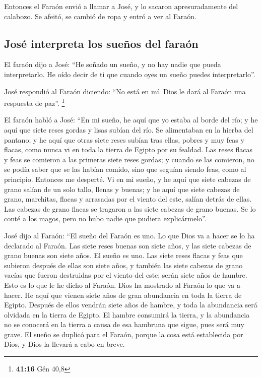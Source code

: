 \begin{paracol}{2}
 Entonces el Faraón envió a llamar a José, y lo sacaron
apresuradamente del calabozo. Se afeitó, se cambió de ropa y entró a ver
al Faraón.

\hypertarget{josuxe9-interpreta-los-sueuxf1os-del-farauxf3n}{%
\subsection{José interpreta los sueños del
faraón}\label{josuxe9-interpreta-los-sueuxf1os-del-farauxf3n}}

 El faraón dijo a José: ``He soñado un sueño, y no hay
nadie que pueda interpretarlo. He oído decir de ti que cuando oyes un
sueño puedes interpretarlo''.

 José respondió al Faraón diciendo: ``No está en mí. Dios
le dará al Faraón una respuesta de paz''. \footnote{\textbf{41:16} Gén
  40,8}

 El faraón habló a José: ``En mi sueño, he aquí que yo
estaba al borde del río;  y he aquí que siete reses
gordas y lisas subían del río. Se alimentaban en la hierba del pantano;
 y he aquí que otras siete reses subían tras ellas,
pobres y muy feas y flacas, como nunca vi en toda la tierra de Egipto
por su fealdad.  Las reses flacas y feas se comieron a
las primeras siete reses gordas;  y cuando se las
comieron, no se podía saber que se las habían comido, sino que seguían
siendo feas, como al principio. Entonces me desperté.  Vi
en mi sueño, y he aquí que siete cabezas de grano salían de un solo
tallo, llenas y buenas;  y he aquí que siete cabezas de
grano, marchitas, flacas y arrasadas por el viento del este, salían
detrás de ellas.  Las cabezas de grano flacas se tragaron
a las siete cabezas de grano buenas. Se lo conté a los magos, pero no
hubo nadie que pudiera explicármelo''.

 José dijo al Faraón: ``El sueño del Faraón es uno. Lo
que Dios va a hacer se lo ha declarado al Faraón.  Las
siete reses buenas son siete años, y las siete cabezas de grano buenas
son siete años. El sueño es uno.  Las siete reses flacas
y feas que subieron después de ellas son siete años, y también las siete
cabezas de grano vacías que fueron destruidas por el viento del este;
serán siete años de hambre.  Esto es lo que le he dicho
al Faraón. Dios ha mostrado al Faraón lo que va a hacer. 
He aquí que vienen siete años de gran abundancia en toda la tierra de
Egipto.  Después de ellos vendrán siete años de hambre, y
toda la abundancia será olvidada en la tierra de Egipto. El hambre
consumirá la tierra,  y la abundancia no se conocerá en
la tierra a causa de esa hambruna que sigue, pues será muy grave.
 El sueño se duplicó para el Faraón, porque la cosa está
establecida por Dios, y Dios la llevará a cabo en breve.


\end{paracol}

